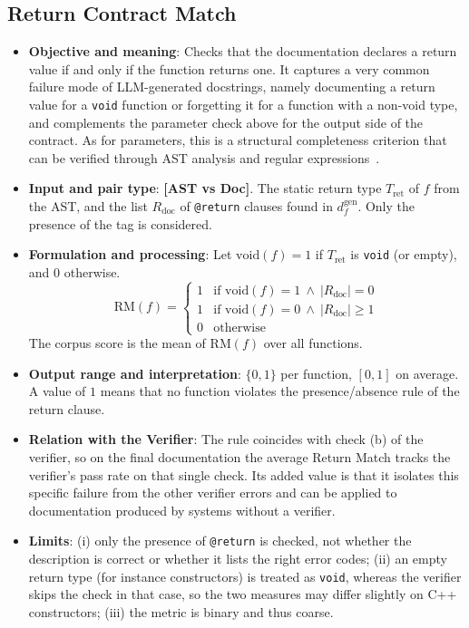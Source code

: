 \subsection{Return Contract Match}
\label{sec:m-return_match}
\begin{itemize}[leftmargin=*, label=\textbullet]
	\item \textbf{Objective and meaning}: Checks that the documentation declares a return value if and
	only if the function returns one. It captures a very common failure mode of LLM-generated
	docstrings, namely documenting a return value for a \texttt{void} function or forgetting it for a
	function with a non-void type, and complements the parameter check above for the output side of
	the contract. As for parameters, this is a structural completeness criterion that can be verified
	through AST analysis and regular expressions~\cite{yang_docagent_2025}.
	
	\item \textbf{Input and pair type}: \textbf{[AST vs Doc]}. The static return type $T_{\mathrm{ret}}$
	of $f$ from the AST, and the list $R_{\mathrm{doc}}$ of \texttt{@return} clauses found in
	$d_f^{\mathrm{gen}}$. Only the presence of the tag is considered.
	
	\item \textbf{Formulation and processing}: Let $\mathrm{void}(f)=1$ if $T_{\mathrm{ret}}$ is
	\texttt{void} (or empty), and $0$ otherwise.
	\begin{equation}
		\mathrm{RM}(f) =
		\begin{cases}
			1 & \text{if } \mathrm{void}(f)=1 \ \wedge\ |R_{\mathrm{doc}}|=0 \\
			1 & \text{if } \mathrm{void}(f)=0 \ \wedge\ |R_{\mathrm{doc}}|\ge 1 \\
			0 & \text{otherwise}
		\end{cases}
		\label{eq:return_match}
	\end{equation}
	The corpus score is the mean of $\mathrm{RM}(f)$ over all functions.
	
	\item \textbf{Output range and interpretation}: $\{0,1\}$ per function, $[0,1]$ on average. A value
	of $1$ means that no function violates the presence/absence rule of the return clause.
	
	\item \textbf{Relation with the Verifier}: The rule coincides with check (b) of the verifier, so on
	the final documentation the average Return Match tracks the verifier's pass rate on that single
	check. Its added value is that it isolates this specific failure from the other verifier errors and
	can be applied to documentation produced by systems without a verifier.
	
	\item \textbf{Limits}: (i) only the presence of \texttt{@return} is checked, not whether the
	description is correct or whether it lists the right error codes; (ii) an empty return type (for
	instance constructors) is treated as \texttt{void}, whereas the verifier skips the check in that
	case, so the two measures may differ slightly on C++ constructors; (iii) the metric is binary and
	thus coarse.
\end{itemize}
